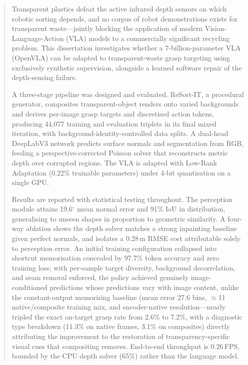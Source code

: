 
\begin{abstract}
Transparent plastics defeat the active infrared depth sensors on which robotic sorting depends, and no corpus of robot demonstrations exists for transparent waste---jointly blocking the application of modern Vision-Language-Action (VLA) models to a commercially significant recycling problem. This dissertation investigates whether a 7-billion-parameter VLA (OpenVLA) can be adapted to transparent-waste grasp targeting using exclusively synthetic supervision, alongside a learned software repair of the depth-sensing failure.

A three-stage pipeline was designed and evaluated. ReSort-IT, a procedural generator, composites transparent-object renders onto varied backgrounds and derives per-image grasp targets and discretised action tokens, producing 44{,}077 training and evaluation triplets in its final mixed iteration, with background-identity-controlled data splits. A dual-head DeepLabV3 network predicts surface normals and segmentation from RGB, feeding a perspective-corrected Poisson solver that reconstructs metric depth over corrupted regions. The VLA is adapted with Low-Rank Adaptation (0.22\% trainable parameters) under 4-bit quantisation on a single GPU.

Results are reported with statistical testing throughout. The perception module attains 19.6$^{\circ}$ mean normal error and 91\% IoU in distribution, generalising to unseen shapes in proportion to geometric similarity. A four-way ablation shows the depth solver matches a strong inpainting baseline given perfect normals, and isolates a 0.28\,m RMSE cost attributable solely to perception error. An initial training configuration collapsed into shortcut memorisation concealed by 97.7\% token accuracy and zero training loss; with per-sample target diversity, background decorrelation, and seam removal enforced, the policy achieved genuinely image-conditioned predictions whose predictions vary with image content, unlike the constant-output memorising baseline (mean error 27.6 bins, $\approx$11%
native/composite training mix, and encoder-native resolution---nearly
tripled the exact on-target grasp rate from 2.6\% to 7.2\%, with a
diagnostic type breakdown (11.3\% on native frames, 3.1\% on composites)
directly attributing the improvement to the restoration of
transparency-specific visual cues that compositing removes.
 End-to-end throughput is 0.26\,FPS, bounded by the CPU depth solver (65\%) rather than the language model.


\end{abstract}
